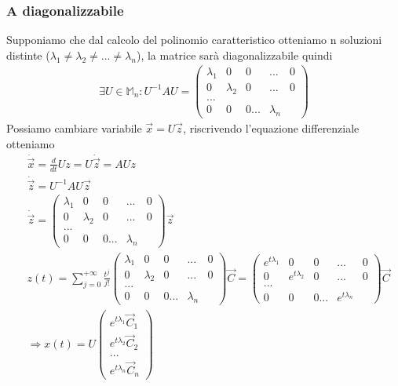 \documentclass[10pt,a4paper]{article}
\begin{document}
\subsubsection{A diagonalizzabile}
Supponiamo che dal calcolo del polinomio caratteristico otteniamo n soluzioni distinte (\(\lambda_1\neq\lambda_2\neq...\neq\lambda_n\)), la matrice sarà diagonalizzabile quindi
\begin{align*}
	\exists U \in \mathbb{M}_n: U^{-1}AU=	
	\begin{pmatrix}
		\lambda_1&0&0&...&0\\
		0&\lambda_2&0&...&0\\
		...\\
		0&0&0...&\lambda_n
	\end{pmatrix}
\end{align*}
Possiamo cambiare variabile \(\vec{x}=U\vec{z}\), riscrivendo l'equazione differenziale otteniamo
\begin{align*}
	&\dot{\vec{x}} = \frac{d}{dt}Uz=U\dot{\vec{z}}=AUz\\
	&\dot{\vec{z}}=U^{-1}AU\vec{z}\\
	&\dot{\vec{z}}=	\begin{pmatrix}
		\lambda_1&0&0&...&0\\
		0&\lambda_2&0&...&0\\
		...\\
		0&0&0...&\lambda_n
	\end{pmatrix} \vec{z}\\
	&z(t) = \sum_{j=0}^{+\infty}\frac{t^j}{j!}	
	\begin{pmatrix}
		\lambda_1&0&0&...&0\\
		0&\lambda_2&0&...&0\\
		...\\
		0&0&0...&\lambda_n
	\end{pmatrix}\vec{C}=	\begin{pmatrix}
	e^{t\lambda_1}&0&0&...&0\\
	0&e^{t\lambda_2}&0&...&0\\
	...\\
	0&0&0...&e^{t\lambda_n}
\end{pmatrix}\vec{C}\\
&\Rightarrow x(t) = U
\begin{pmatrix}
	e^{t\lambda_1}\vec{C}_1\\
	e^{t\lambda_2}\vec{C}_2\\
	...\\
	e^{t\lambda_n}\vec{C}_n
\end{pmatrix}
\end{align*}
\end{document}
